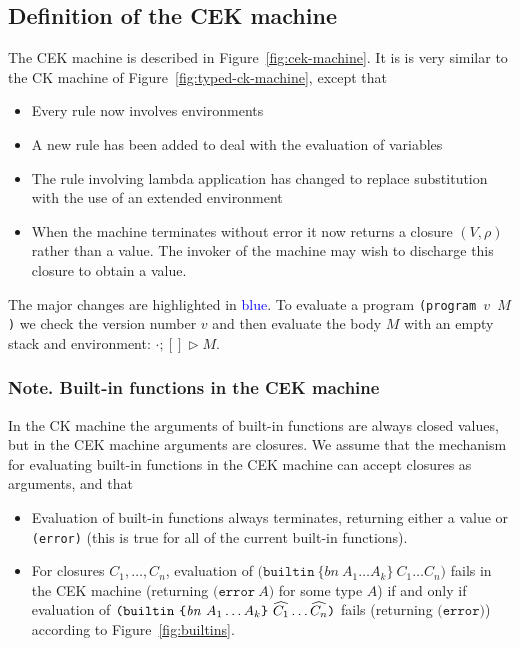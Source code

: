\documentclass[a4paper]{article}
\newcommand{\blue}[1]{\textcolor{blue}{#1}}
\newcommand{\keyword}[1]{\texttt{#1}}
\newcommand{\construct}[1]{\texttt{(} #1 \texttt{)}}
\newcommand\discharge[1]{\widehat{#1}}
\newcommand{\builtin}[3]{\construct{\keyword{builtin} ~ \texttt{\{} \mathit{#1} ~ #2 \texttt{\}} ~ #3}}
\newcommand{\error}[1]{\construct{\keyword{error} ~ #1}}
\newcommand{\errorU}{\construct{\keyword{error}}}
\newcommand{\compute}{\triangleright}
\begin{document}
\begin{appendices}
\subsection{Definition of the CEK machine}
The CEK machine is described in Figure~\ref{fig:cek-machine}.  It is
  is very similar to the CK machine of Figure~\ref{fig:typed-ck-machine},
  except that
\begin{itemize}
\item Every rule now involves environments
\item A new rule has been added to deal with the evaluation of variables
\item The rule involving lambda application has changed to replace substitution with
the use of an extended environment
\item When the machine terminates without error it now
returns a closure $(V,\rho)$ rather than a value.  The invoker
of the machine may wish to discharge this closure to obtain a value.
\end{itemize}
\noindent The major changes are highlighted in \blue{blue}. To evaluate a program
\texttt{(program $v$ $M$)} we check the version number $v$ and then evaluate the body $M$
with an empty stack and environment: $\cdot;[] \compute M$.



\subsubsection{Note. Built-in functions in the CEK machine}
\label{sec:typed-cek-builtins}
In the CK machine the arguments of built-in functions are always
closed values, but in the CEK machine arguments are closures.  We
assume that the mechanism for evaluating built-in functions in the CEK
machine can accept closures as arguments, and that
\begin{itemize}
\item Evaluation of built-in functions always terminates, returning either a value or \texttt{(error)}
(this is true for all of the current built-in functions).


\item For closures $C_1, \ldots, C_n$, evaluation of
  $\builtin{bn}{A_1 \ldots A_k}{C_1 \ldots C_n}$ fails in the CEK
machine (returning $\error{A}$ for some type $A$) if and only
if evaluation of $\builtin{bn}{A_1 \\ \ldots  %
A_k}{\discharge{C_1} \ldots \discharge{C_n}}$ fails (returning $\errorU$) according to
Figure~\ref{fig:builtins}.


\end{itemize}
\end{appendices}
\end{document}
